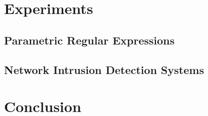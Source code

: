 \documentclass{ExcelAtFIT}
\begin{document}
\section{Experiments}
\subsection{Parametric Regular Expressions}
\subsection{Network Intrusion Detection Systems}


\section{Conclusion}






\end{document}
